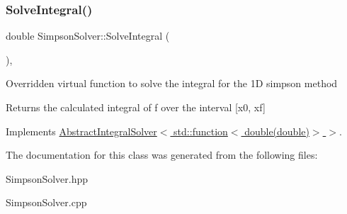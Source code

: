 \subsubsection{\texorpdfstring{Solve\+Integral()}{SolveIntegral()}}
{\footnotesize\ttfamily double Simpson\+Solver\+::\+Solve\+Integral (\begin{DoxyParamCaption}{ }\end{DoxyParamCaption})\hspace{0.3cm}{\ttfamily [override]}, {\ttfamily [virtual]}}

Overridden virtual function to solve the integral for the 1D simpson method \begin{DoxyReturn}{Returns}
the calculated integral of f over the interval \mbox{[}x0, xf\mbox{]} 
\end{DoxyReturn}


Implements \hyperlink{class_abstract_integral_solver}{Abstract\+Integral\+Solver$<$ std\+::function$<$ double(double)$>$ $>$}.



The documentation for this class was generated from the following files\+:\begin{DoxyCompactItemize}
\item 
Simpson\+Solver.\+hpp\item 
Simpson\+Solver.\+cpp\end{DoxyCompactItemize}
